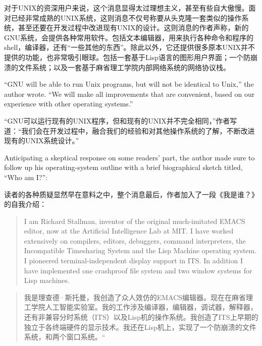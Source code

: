 \ifdefined\chs
对于UNIX的资深用户来说，这个消息显得太过理想主义，甚至有些自大傲慢。面对已经非常成熟的UNIX系统，这则消息不仅号称要从头克隆一套类似的操作系统，甚至还要在开发过程中改进现有UNIX的设计。这则消息的作者声称，新的GNU系统，会提供各种常用软件。包括文本编辑器，用来执行各种命令和程序的shell，编译器，还有``一些其他的东西''。除此以外，它还提供很多原本UNIX并不提供的功能，也非常吸引眼球。包括一套基于Lisp语言的图形用户界面；一个防崩溃的文件系统；以及一套基于麻省理工学院内部网络系统的网络协议栈。
\fi

\ifdefined\eng
``GNU will be able to run Unix programs, but will not be identical to Unix,'' the author wrote. ``We will make all improvements that are convenient, based on our experience with other operating systems.''
\fi

\ifdefined\chs
``GNU可以运行现有的UNIX程序，但和现有的UNIX并不完全相同，''作者写道：``我们会在开发过程中，融合我们的经验和对其他操作系统的了解，不断改进现有的UNIX系统设计。''
\fi

\ifdefined\eng
Anticipating a skeptical response on some readers' part, the author made sure to follow up his operating-system outline with a brief biographical sketch titled, ``Who am I?'':
\fi

\ifdefined\chs
读者的各种质疑显然早在意料之中，整个消息最后，作者加入了一段《我是谁？》的自我介绍：
\fi

\ifdefined\eng
\begin{quote}
I am Richard Stallman, inventor of the original much-imitated EMACS editor, now at the Artificial Intelligence Lab at MIT. I have worked extensively on compilers, editors, debuggers, command interpreters, the Incompatible Timesharing System and the Lisp Machine operating system. I pioneered terminal-independent display support in ITS. In addition I have implemented one crashproof file system and two window systems for Lisp machines.
\end{quote}
\fi

\ifdefined\chs
\begin{quote}
我是理查德·斯托曼，我创造了众人效仿的EMACS编辑器。现在在麻省理工学院人工智能实验室。我的工作涉及编译器，编辑器，调试器，解释器，还有非兼容分时系统（ITS）以及Lisp机的操作系统。我创造了ITS上早期的独立于各终端硬件的显示技术。我还在Lisp机上，实现了一个防崩溃的文件系统，和两个窗口系统。``
\end{quote}
\fi

